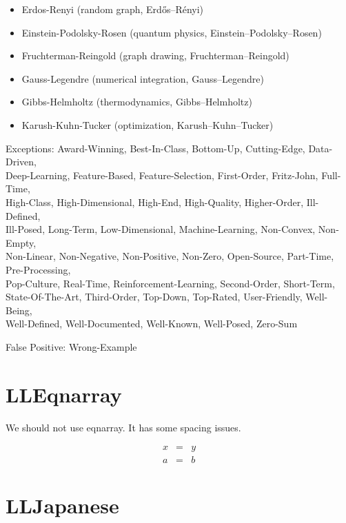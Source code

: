 \documentclass[a4paper]{article}
\begin{document}
\begin{itemize}
	\item Erdos-Renyi (random graph, Erd\H{o}s--R\'enyi)
	\item Einstein-Podolsky-Rosen (quantum physics, Einstein--Podolsky--Rosen)
	\item Fruchterman-Reingold (graph drawing, Fruchterman--Reingold)
	\item Gauss-Legendre (numerical integration, Gauss--Legendre)
	\item Gibbs-Helmholtz (thermodynamics, Gibbs--Helmholtz)
	\item Karush-Kuhn-Tucker (optimization, Karush--Kuhn--Tucker)
\end{itemize}

Exceptions: Award-Winning, Best-In-Class, Bottom-Up, Cutting-Edge, Data-Driven,\\
Deep-Learning, Feature-Based, Feature-Selection, First-Order, Fritz-John, Full-Time,\\
High-Class, High-Dimensional, High-End, High-Quality, Higher-Order, Ill-Defined,\\
Ill-Posed, Long-Term, Low-Dimensional, Machine-Learning, Non-Convex, Non-Empty,\\
Non-Linear, Non-Negative, Non-Positive, Non-Zero, Open-Source, Part-Time, Pre-Processing, \\
Pop-Culture, Real-Time, Reinforcement-Learning, Second-Order, Short-Term,\\
State-Of-The-Art, Third-Order, Top-Down, Top-Rated, User-Friendly, Well-Being,\\
Well-Defined, Well-Documented, Well-Known, Well-Posed, Zero-Sum


\vspace{\baselineskip}

False Positive: Wrong-Example

\section{LLEqnarray}

We should not use eqnarray. It has some spacing issues.

\begin{eqnarray*}
	x & = & y \\
	a & = & b
\end{eqnarray*}

\section{LLJapanese}
\end{document}
